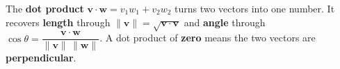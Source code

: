 \documentclass[10pt]{article}
\begin{document}
\vspace{0.10in}

\begin{remindbox}
\small The \textbf{dot product} $\mathbf{v}\cdot\mathbf{w}=v_1w_1+v_2w_2$ turns two vectors into
one number. It recovers \textbf{length} through $\|\mathbf{v}\|=\sqrt{\mathbf{v}\cdot\mathbf{v}}$
and \textbf{angle} through $\cos\theta=\dfrac{\mathbf{v}\cdot\mathbf{w}}{\|\mathbf{v}\|\,\|\mathbf{w}\|}$.
A dot product of \textbf{zero} means the two vectors are \textbf{perpendicular}.
\end{remindbox}
\end{document}
